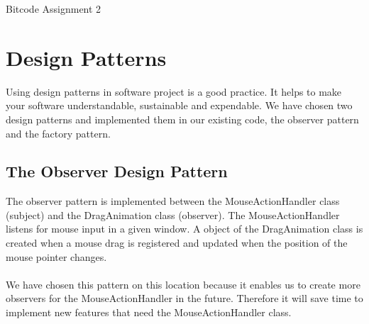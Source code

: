 \documentclass{article}
\begin{document}

\begin{titlepage}
	\Huge{Bitcode Assignment 2}
\end{titlepage}


\section{Design Patterns}
Using design patterns in software project is a good practice. It helps to make your software understandable, sustainable and expendable. We have chosen two design patterns and implemented them in our existing code, the observer pattern and the factory pattern.

\subsection{The Observer Design Pattern}
The observer pattern is implemented between the MouseActionHandler class (subject) and the DragAnimation class (observer). The MouseActionHandler listens for mouse input in a given window. A object of the DragAnimation class is created when a mouse drag is registered and updated when the position of the mouse pointer changes. 
\paragraph{} We have chosen this pattern on this location because it enables us to create more observers for the MouseActionHandler in the future. Therefore it will save time to implement new features that need the MouseActionHandler class.
 
\end{document}

